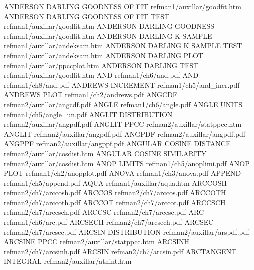 ANDERSON DARLING GOODNESS OF FIT        refman1/auxillar/goodfit.htm
ANDERSON DARLING GOODNESS OF FIT TEST   refman1/auxillar/goodfit.htm
ANDERSON DARLING GOODNESS               refman1/auxillar/goodfit.htm
ANDERSON DARLING K SAMPLE               refman1/auxillar/andeksam.htm
ANDERSON DARLING K SAMPLE TEST          refman1/auxillar/andeksam.htm
ANDERSON DARLING PLOT                   refman1/auxillar/ppccplot.htm
ANDERSON DARLING TEST                   refman1/auxillar/goodfit.htm
AND                                     refman1/ch6/and.pdf
AND                                     refman1/ch8/and.pdf
ANDREWS INCREMENT                       refman1/ch5/and_incr.pdf
ANDREWS PLOT                            refman1/ch2/andrews.pdf
ANGCDF                                  refman2/auxillar/angcdf.pdf
ANGLE                                   refman1/ch6/angle.pdf
ANGLE UNITS                             refman1/ch5/angle_un.pdf
ANGLIT DISTRIBUTION                     refman2/auxillar/angpdf.pdf
ANGLIT PPCC                             refman2/auxillar/statppcc.htm
ANGLIT                                  refman2/auxillar/angpdf.pdf
ANGPDF                                  refman2/auxillar/angpdf.pdf
ANGPPF                                  refman2/auxillar/angppf.pdf
ANGULAR COSINE DISTANCE                 refman2/auxillar/cosdist.htm
ANGULAR COSINE SIMILARITY               refman2/auxillar/cosdist.htm
ANOP LIMITS                             refman1/ch5/anoplimi.pdf
ANOP PLOT                               refman1/ch2/anopplot.pdf
ANOVA                                   refman1/ch3/anova.pdf
APPEND                                  refman1/ch5/append.pdf
AQUA                                    refman1/auxillar/aqua.htm
ARCCOSH                                 refman2/ch7/arccosh.pdf
ARCCOS                                  refman2/ch7/arccos.pdf
ARCCOTH                                 refman2/ch7/arccoth.pdf
ARCCOT                                  refman2/ch7/arccot.pdf
ARCCSCH                                 refman2/ch7/arccsch.pdf
ARCCSC                                  refman2/ch7/arccsc.pdf
ARC                                     refman1/ch6/arc.pdf
ARCSECH                                 refman2/ch7/arcsech.pdf
ARCSEC                                  refman2/ch7/arcsec.pdf
ARCSIN DISTRIBUTION                     refman2/auxillar/arspdf.pdf
ARCSINE PPCC                            refman2/auxillar/statppcc.htm
ARCSINH                                 refman2/ch7/arcsinh.pdf
ARCSIN                                  refman2/ch7/arcsin.pdf
ARCTANGENT INTEGRAL                     refman2/auxillar/atnint.htm
